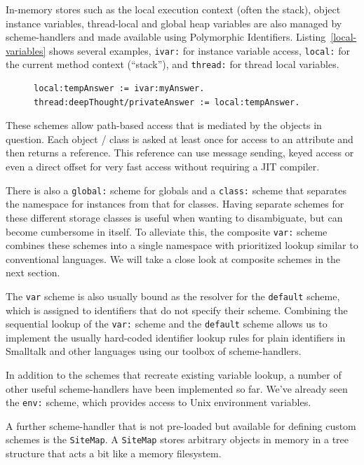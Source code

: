 \documentclass{acm_proc_article-sp}
\begin{document}
In-memory stores such as the local execution context (often the stack), object instance
variables, thread-local and global heap variables are also managed by scheme-handlers
and made available using Polymorphic Identifiers.  Listing~\ref{local-variables} shows
several examples, {\tt ivar:} for instance variable access, {\tt local:} for the current
method context (``stack''), and {\tt thread:} for thread local variables.

\begin{figure}[htbp]
\begin{lstlisting}[style=numbers,label=local-variables,caption=Different memory variables.]
local:tempAnswer := ivar:myAnswer.
thread:deepThought/privateAnswer := local:tempAnswer.
\end{lstlisting}
\end{figure}

These schemes allow path-based access
that is mediated by the objects in question.   Each object / class is asked at least
once for access to an attribute and then returns a reference.   This reference can
use message sending, keyed access or even a direct offset for very fast
access without requiring a JIT compiler.

There is also a {\tt global:} scheme for globals and a {\tt class:} scheme that separates
the namespace for instances from that for classes.  Having separate schemes for
these different storage classes is useful when wanting to disambiguate,
but can become cumbersome in itself.  To alleviate this, the composite
{\tt var:} scheme combines these schemes into a single namespace
with prioritized lookup similar to conventional languages.  We will take
a close look at composite schemes in the next section.  

The {\tt var} scheme is also usually bound as the resolver for the {\tt default}
scheme, which is assigned to identifiers that do not specify their scheme.
Combining the sequential lookup of the {\tt var:} scheme and the {\tt default}
scheme allows us to implement the usually hard-coded identifier lookup
rules for plain identifiers in Smalltalk and other languages using
our toolbox of scheme-handlers.

In addition to the schemes that recreate existing variable lookup, a number
of other useful scheme-handlers have been implemented so far.  We've
already seen the {\tt env:} scheme, which provides access to Unix
environment variables.  

A further scheme-handler that is not pre-loaded but available for defining
custom schemes is the {\tt SiteMap}.  A {\tt SiteMap} stores arbitrary objects
in memory in a tree structure that acts a bit like a memory filesystem.
\end{document}

